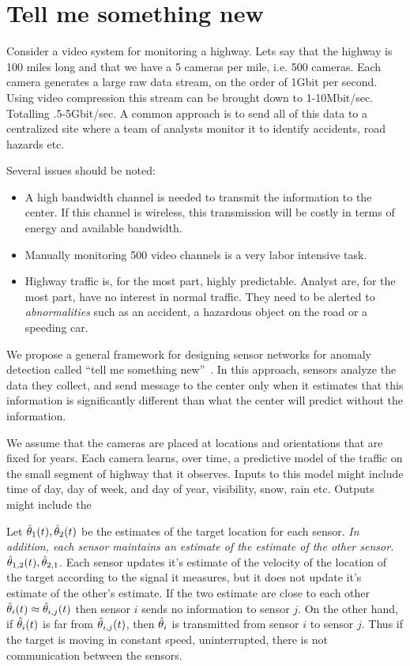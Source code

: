 \section{Tell me something new}

Consider a video system for monitoring a highway. Lets say that the
highway is 100 miles long and that we have a 5 cameras per mile,
i.e. 500 cameras. Each camera generates a large raw data stream, on
the order of 1Gbit per second. Using video compression this stream can
be brought down to 1-10Mbit/sec. Totalling .5-5Gbit/sec. A common approach
is to send all of this data to a centralized site where a team of
analysts monitor it to identify accidents, road hazards etc.

Several issues should be noted:
\begin{itemize}
\item A high bandwidth channel is needed to transmit the information
  to the center. If this channel is wireless, this transmission will
  be costly in terms of energy and available bandwidth.
\item Manually monitoring 500 video channels is a very labor intensive task. 
\item Highway traffic is, for the most part, highly
  predictable. Analyst are, for the most part, have no interest in normal traffic. 
  They need to be alerted to {\em abnormalities} such as an accident, a hazardous 
  object on the road or a speeding car.
\end{itemize}

We propose a general framework for designing sensor networks for
anomaly detection called ``tell me something new''~\cite{TMSN}. In
this approach, sensors analyze the data they collect, and send message
to the center only when it estimates that this information is
significantly different than what the center will predict without the
information.

We assume that the cameras are placed at locations and orientations that are fixed for years.
Each camera learns, over time, a predictive model of the traffic on the small segment of 
highway that it observes. Inputs to this model might include time of day, day of week, and day of year, visibility, snow, rain etc. Outputs might include the 


Let $\hat{\theta}_1(t),\hat{\theta}_2(t)$ be the estimates of the target
location for each sensor. {\em In addition, each sensor maintains an
  estimate of the estimate of the other sensor.}
$\hat{\theta}_{1,2}(t),\hat{\theta}_{2,1}$. Each sensor updates it's estimate of
the velocity of the location of the target according to the signal it
measures, but it does not update it's estimate of the other's
estimate.  If the two estimate are close to each other $\hat{\theta}_i(t)
\approx \hat{\theta}_{i,j}(t)$ then sensor $i$ sends no information to
sensor $j$. On the other hand, if $\hat{\theta}_i(t)$ is far from
$\hat{\theta}_{i,j}(t)$, then $\hat{\theta}_{i}$ is transmitted from sensor $i$
to sensor $j$. Thus if the target is moving in constant speed,
uninterrupted, there is not communication between the sensors.

